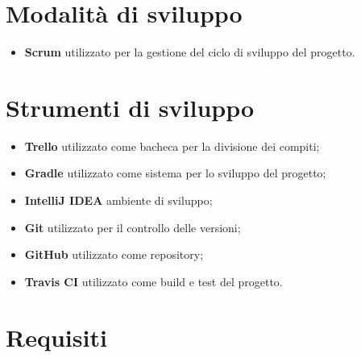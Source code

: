 \documentclass[12pt, italian]{article}
\begin{document}
\section{Modalità di sviluppo}
\begin{itemize}
	\item \textbf{Scrum} utilizzato per la gestione del ciclo di sviluppo del progetto.
\end{itemize}
\section{Strumenti di sviluppo}
\begin{itemize}
	\item \textbf{Trello} utilizzato come bacheca per la divisione dei compiti;
	\item \textbf{Gradle} utilizzato come sistema per lo sviluppo del progetto;
	\item \textbf{IntelliJ IDEA} ambiente di sviluppo;
	\item \textbf{Git} utilizzato per il controllo delle versioni;
	\item \textbf{GitHub} utilizzato come repository;
	\item \textbf{Travis CI} utilizzato come build e test del progetto.
\end{itemize}

\section{Requisiti}
\end{document}
